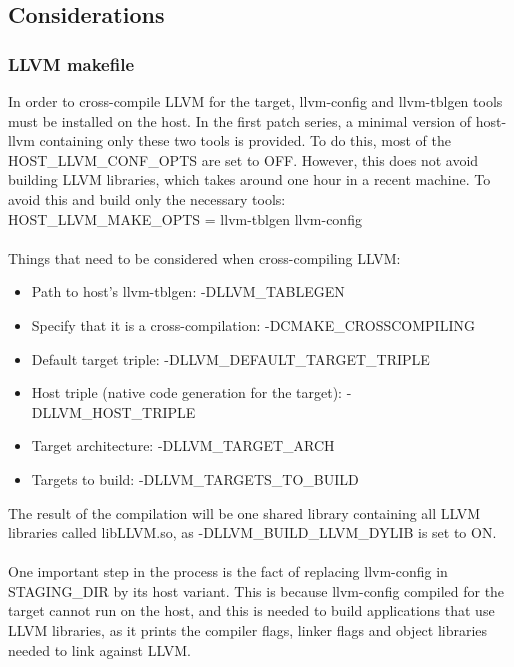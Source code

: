 \documentclass[12pt,a4paper,oneside]{article}
\begin{document}
\subsection*{Considerations}

\subsubsection*{LLVM makefile}
In order to cross-compile LLVM for the target, llvm-config and llvm-tblgen tools
must be installed on the host. In the first patch series, a minimal version of
host-llvm containing only these two tools is provided. To do this, most of the
{\selectfont HOST\_LLVM\_CONF\_OPTS} are set to OFF. However,
this does not avoid building LLVM libraries, which takes around one hour in a
recent machine. To avoid this and build only the necessary tools:\\
{\selectfont HOST\_LLVM\_MAKE\_OPTS = llvm-tblgen llvm-config}\\\\
Things that need to be considered when cross-compiling LLVM:
\begin{itemize}
  \item Path to host's llvm-tblgen: {\selectfont
  -DLLVM\_TABLEGEN}
  \item Specify that it is a cross-compilation: {\selectfont
  -DCMAKE\_CROSSCOMPILING}
  \item Default target triple: {\selectfont
  -DLLVM\_DEFAULT\_TARGET\_TRIPLE}
  \item Host triple (native code generation for the target): {\selectfont
  -DLLVM\_HOST\_TRIPLE}
  \item Target architecture: {\selectfont
  -DLLVM\_TARGET\_ARCH}
  \item Targets to build: {\selectfont
  -DLLVM\_TARGETS\_TO\_BUILD}
\end{itemize}
The result of the compilation will be one shared library containing all LLVM
libraries called libLLVM.so, as {\selectfont
-DLLVM\_BUILD\_LLVM\_DYLIB} is set to ON.\\\\
One important step in the process is the fact of replacing llvm-config in STAGING\_DIR
by its host variant. This is because llvm-config compiled for the target cannot
run on the host, and this is needed to build applications that use LLVM libraries,
as it prints the compiler flags, linker flags and object libraries needed to link
against LLVM.
\end{document}
